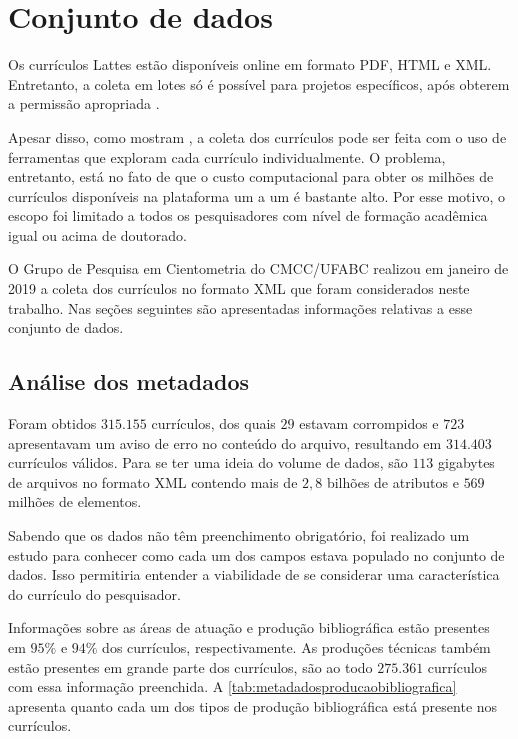 \chapter[Conjunto de dados]{Conjunto de dados}

Os currículos Lattes estão disponíveis online em formato PDF, HTML e XML. Entretanto, a coleta em lotes só é possível para projetos específicos, após obterem a permissão apropriada \cite{medeiros2013dynamics}.

Apesar disso, como mostram , a coleta dos currículos pode ser feita com o uso de ferramentas que exploram cada currículo individualmente. O problema, entretanto, está no fato de que o custo computacional para obter os milhões de currículos disponíveis na plataforma um a um é bastante alto. Por esse motivo, o escopo foi limitado a todos os pesquisadores com nível de formação acadêmica igual ou acima de doutorado.

O Grupo de Pesquisa em Cientometria do CMCC/UFABC realizou em janeiro de 2019 a coleta dos currículos no formato XML que foram considerados neste trabalho. Nas seções seguintes são apresentadas informações relativas a esse conjunto de dados.

\section{Análise dos metadados}

Foram obtidos $315.155$ currículos, dos quais $29$ estavam corrompidos e $723$ apresentavam um aviso de erro no conteúdo do arquivo, resultando em $314.403$ currículos válidos. Para se ter uma ideia do volume de dados, são $113$ gigabytes de arquivos no formato XML contendo mais de $2,8$ bilhões de atributos e $569$ milhões de elementos.

Sabendo que os dados não têm preenchimento obrigatório, foi realizado um estudo para conhecer como cada um dos campos estava populado no conjunto de dados. Isso permitiria entender a viabilidade de se considerar uma característica do currículo do pesquisador.

Informações sobre as áreas de atuação e produção bibliográfica estão presentes em $95\%$ e $94\%$ dos currículos, respectivamente. As produções técnicas também estão presentes em grande parte dos currículos, são ao todo $275.361$ currículos com essa informação preenchida. A \autoref{tab:metadadosproducaobibliografica} apresenta quanto cada um dos tipos de produção bibliográfica está presente nos currículos. 

